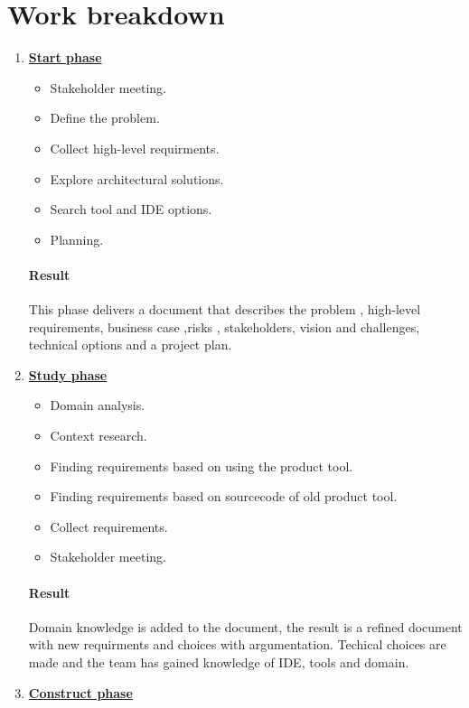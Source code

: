 \documentclass[a4paper,11pt,twoside,draft]{article}
\begin{document}
\section{Work breakdown}

\begin{enumerate}
	\item \underline{\textbf{Start phase}}
	\begin{itemize}
		\item Stakeholder meeting.
		\item Define the problem.
		\item Collect high-level requirments.
		\item Explore architectural solutions.
		\item Search tool and IDE options.
		\item Planning. 
	\end{itemize}
	\paragraph{Result}
	This phase delivers a document that describes the problem , high-level requirements, business case ,risks , stakeholders, vision and challenges, technical options and a project plan.
	
	\item \underline{\textbf{Study phase}}
		\begin{itemize}
			\item Domain analysis.
			\item Context research.
			\item Finding requirements based on using the product tool.
			\item Finding requirements based on sourcecode of old product tool.
			\item Collect requirements.
			\item Stakeholder meeting.
		\end{itemize}
	\paragraph{Result}
	Domain knowledge is added to the document, the result is a refined document with new requirments and choices with argumentation. Techical choices are made and the team has gained knowledge of IDE, tools and domain. 
		
	\item \underline{\textbf{Construct phase}}
	

\end{enumerate}
\end{document}
